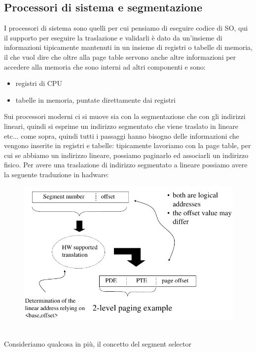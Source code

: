 \documentclass[12pt, oneside]{extbook}
\begin{document}
\subsection{Processori di sistema e segmentazione}
I processori di sistema sono quelli per cui pensiamo di eseguire codice di SO, qui il supporto per eseguire la traslazione e validarli è dato da un'insieme di informazioni tipicamente mantenuti in un insieme di registri o tabelle di memoria, il che vuol dire che oltre alla page table servono anche altre informazioni per accedere alla memoria che sono interni ad altri componenti e sono:
\begin{itemize}
\item registri di CPU
\item tabelle in memoria, puntate direttamente dai registri
\end{itemize}
Sui processori moderni ci si muove sia con la segmentazione che con gli indirizzi lineari, quindi si esprime un indirizzo segmentato che viene traslato in lineare etc... come sopra, quindi tutti i passaggi hanno bisogno delle informazioni che vengono inserite in registri e tabelle: tipicamente lavoriamo con la page table, per cui se abbiamo un indirizzo lineare, possiamo paginarlo ed associarli un indirizzo fisico. Per avere una traslazione di indirizzo segmentato a lineare possiamo avere la seguente traduzione in hadware:
\begin{figure}[!h]
	\includegraphics[scale=0.3]{immagini/seg_pag.png}
\end{figure}
\\ Consideriamo qualcosa in più, il concetto del segment selector
\end{document}
